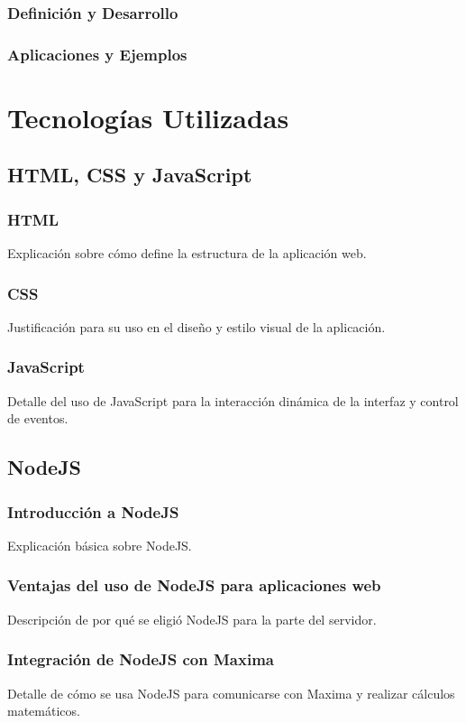 \subsubsection{Definición y Desarrollo}
\subsubsection{Aplicaciones y Ejemplos}

\section{Tecnologías Utilizadas}

\subsection{HTML, CSS y JavaScript}
\subsubsection{HTML}
Explicación sobre cómo define la estructura de la aplicación web.
\subsubsection{CSS}
Justificación para su uso en el diseño y estilo visual de la aplicación.
\subsubsection{JavaScript}
Detalle del uso de JavaScript para la interacción dinámica de la interfaz y control de eventos.

\subsection{NodeJS}
\subsubsection{Introducción a NodeJS}
Explicación básica sobre NodeJS.
\subsubsection{Ventajas del uso de NodeJS para aplicaciones web}
Descripción de por qué se eligió NodeJS para la parte del servidor.
\subsubsection{Integración de NodeJS con Maxima}
Detalle de cómo se usa NodeJS para comunicarse con Maxima y realizar cálculos matemáticos.

